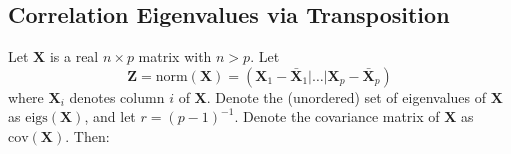 \documentclass[12pt]{spieman}  %
\begin{document}
\begin{spacing}{2}



\appendix    %

\section{Correlation Eigenvalues via Transposition}
\label{sec:transpose}

Let \(\mathbf{X}\) is a real \(n \times p\) matrix with \(n > p\). Let
\[
\mathbf{Z} = \text{norm}(\mathbf{X}) =
\left(
\mathbf{X}_1 - \bar{\mathbf{X}}_1 | \dots | \mathbf{X}_p - \bar{\mathbf{X}}_p
\right)
\]
where \(\mathbf{X}_i\) denotes column \(i\) of \(\mathbf{X}\). Denote the (unordered) set
of eigenvalues of \(\mathbf{X}\) as \(\text{eigs}(\mathbf{X})\), and let \(r = (p - 1)^{-1}\).
Denote the covariance matrix of \(\mathbf{X}\) as \(\text{cov}(\mathbf{X})\).  Then:


\end{spacing}
\end{document}
